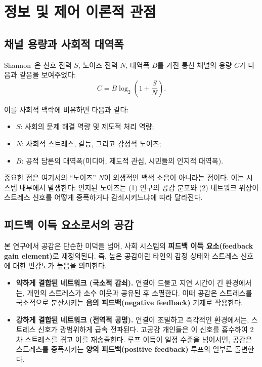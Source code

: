 \documentclass[11pt]{article}
\theoremstyle{plain}
\begin{document}
\section{정보 및 제어 이론적 관점}

\subsection{채널 용량과 사회적 대역폭}

Shannon~\cite{shannon1948}은 신호 전력 $S$, 노이즈 전력 $N$, 대역폭 $B$를 가진 통신 채널의 용량 $C$가 다음과 같음을 보여주었다:
\begin{equation}
C = B \log_2\left(1 + \frac{S}{N}\right).
\end{equation}

이를 사회적 맥락에 비유하면 다음과 같다:
\begin{itemize}
  \item $S$: 사회의 문제 해결 역량 및 제도적 처리 역량;
  \item $N$: 사회적 스트레스, 갈등, 그리고 감정적 노이즈;
  \item $B$: 공적 담론의 대역폭(미디어, 제도적 관심, 시민들의 인지적 대역폭).
\end{itemize}

중요한 점은 여기서의 ``노이즈'' $N$이 외생적인 백색 소음이 아니라는 점이다.
이는 시스템 내부에서 발생한다: 인지된 노이즈는 (1) 인구의 공감 분포와 (2) 네트워크 위상이 스트레스 신호를 어떻게 증폭하거나 감쇠시키느냐에 따라 달라진다.

\subsection{피드백 이득 요소로서의 공감}

본 연구에서 공감은 단순한 미덕을 넘어, 사회 시스템의 \textbf{피드백 이득 요소(feedback gain element)}로 재정의된다.
즉, 높은 공감이란 타인의 감정 상태와 스트레스 신호에 대한 민감도가 높음을 의미한다.

\begin{itemize}
  \item \textbf{약하게 결합된 네트워크 (국소적 감쇠).}  
  연결이 드물고 지연 시간이 긴 환경에서는, 개인의 스트레스가 소수 이웃과 공유된 후 소멸한다.
  이때 공감은 스트레스를 국소적으로 분산시키는 \textbf{음의 피드백(negative feedback)} 기제로 작용한다.

  \item \textbf{강하게 결합된 네트워크 (전역적 공명).}  
  연결이 조밀하고 즉각적인 환경에서는, 스트레스 신호가 광범위하게 급속 전파된다.
  고공감 개인들은 이 신호를 흡수하여 2차 스트레스를 겪고 이를 재송출한다.
  루프 이득이 일정 수준을 넘어서면, 공감은 스트레스를 증폭시키는 \textbf{양의 피드백(positive feedback)} 루프의 일부로 돌변한다.
\end{itemize}
\end{document}
